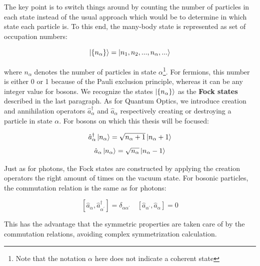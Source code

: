 The key point is to switch things around by counting the number of particles in each state instead of the usual approach which would be to determine in which state each particle is. To this end, the many-body state is represented as set of occupation numbers:

\begin{equation}
   \ket{ \{n_{\alpha}\}} = \ket{n_1,n_2,...,n_{\alpha},...}
\end{equation}

\noindent where $n_{\alpha}$ denotes the number of particles in state $\alpha$\footnote{Note that the notation $\alpha$ here does not indicate a coherent state}. For fermions, this number is either 0 or 1 because of the Pauli exclusion principle, whereas it can be any integer value for bosons. We recognize the states $\ket{ \{n_{\alpha}\}}$ as the \textbf{Fock states} described in the last paragraph. As for Quantum Optics, we introduce creation and annihilation operators $\hat{a}^{\dagger}_{\alpha}$ and $\hat{a}_{\alpha}$ respectively creating or destroying a particle in state $\alpha$. For bosons on which this thesis will be focused:

\begin{equation}
    \hat{a}_{\alpha}^{\dagger} \ket{n_{\alpha}}=\sqrt{n_{\alpha}+1}\left|n_{\alpha}+1\right\rangle
\end{equation}
\begin{equation}
    \hat{a}_{\alpha} \ket{n_{\alpha}}=\sqrt{n_{\alpha}}\left|n_{\alpha}-1\right\rangle
\end{equation}

Just as for photons, the Fock states are constructed by applying the creation operators the right amount of times on the vacuum state. For bosonic particles, the commutation relation is the same as for photons:

\begin{equation}
    \left[\hat{a}_{\alpha}, \hat{a}_{\alpha^{\prime}}^{\dagger}\right]=\delta_{\alpha \alpha^{\prime}} \quad\left[\hat{a}_{\alpha^{\prime}}, \hat{a}_{\alpha}\right]=0
\end{equation}

\noindent This has the advantage that the symmetric properties are taken care of by the commutation relations, avoiding complex symmetrization calculation. 


